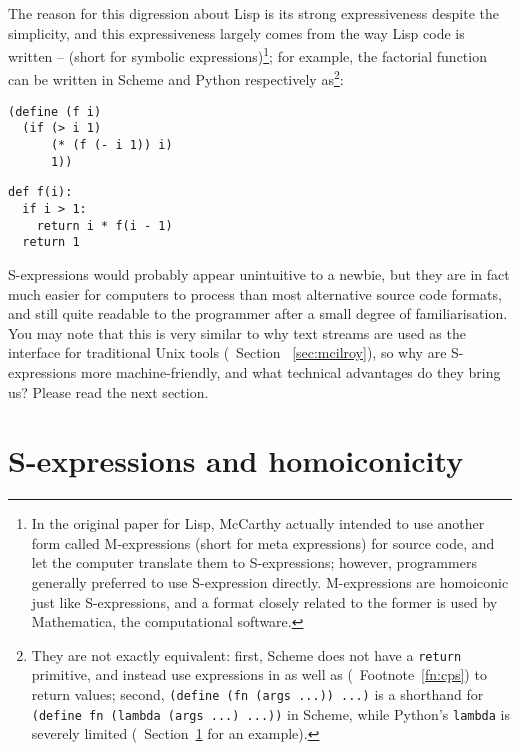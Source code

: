 The reason for this digression about Lisp is its strong expressiveness despite
the simplicity, and this expressiveness largely comes from the way Lisp code is
written --  (short for symbolic expressions)\footnote%
{In the original paper for Lisp, McCarthy actually
intended to use another form called M-expressions (short for meta expressions)
for source code, and let the computer translate them to S-expressions; however,
programmers generally preferred to use S-expression directly.  M-expressions are
homoiconic just like S-expressions, and a format closely related to the former
is used by Mathematica, the computational software.}; for example, the factorial
function can be written in Scheme and Python respectively as\footnote{They
are not exactly equivalent: first, Scheme does not have a \texttt{return}
primitive, and instead use expressions in  as well as
 (\cf~Footnote~\ref{fn:cps}) to return values; second,
\texttt{(define (fn (args ...)) ...)} is a shorthand for \texttt{(define fn
(lambda (args ...) ...))} in Scheme, while Python's \texttt{lambda} is
severely limited (\cf~Section~\ref{sec:homoiconic} for an example).}:
\colskipa\begin{multicols}{2}
\begin{quoting}
\begin{Verbatim}
(define (f i)
  (if (> i 1)
      (* (f (- i 1)) i)
      1))
\end{Verbatim}
\end{quoting}
\begin{quoting}
\begin{Verbatim}
def f(i):
  if i > 1:
    return i * f(i - 1)
  return 1
\end{Verbatim}
\end{quoting}
\end{multicols}\colskipb\noindent%
S-expressions would probably appear unintuitive to a newbie, but they are in
fact much easier for computers to process than most alternative source code
formats, and still quite readable to the programmer after a small degree of
familiarisation.  You may note that this is very similar to why text streams
are used as the interface for traditional Unix tools (\cf~Section~%
\ref{sec:mcilroy}), so why are S-expressions more machine-friendly, and
what technical advantages do they bring us?  Please read the next section.

\newpart
\section{S-expressions and homoiconicity}\label{sec:homoiconic}

